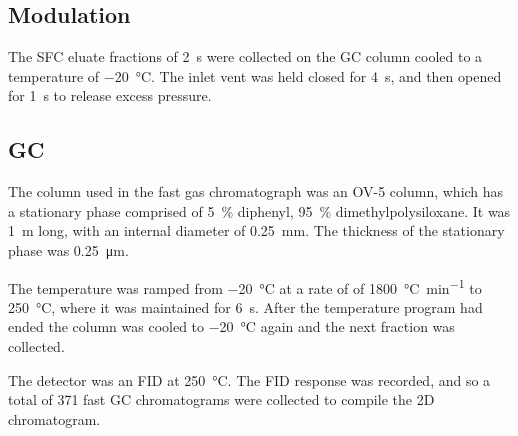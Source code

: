 \subsection{Modulation}

The SFC eluate fractions of \SI{2}{\second} were collected on the GC column
cooled to a temperature of \SI{-20}{\celsius}. The inlet vent was held closed
for \SI{4}{\second}, and then opened for \SI{1}{\second} to release excess
pressure.

\subsection{GC}

The column used in the fast gas chromatograph was an OV-5 column, which has a
stationary phase comprised of \SI{5}{\percent} diphenyl, \SI{95}{\percent}
dimethylpolysiloxane. It was \SI{1}{\metre} long, with an internal diameter of
\SI{0.25}{\milli\metre}. The thickness of the stationary phase was
\SI{0.25}{\micro\metre}.

The temperature was ramped from \SI{-20}{\celsius} at a rate of of
\SI{1800}{\celsius\per\minute} to \SI{250}{\celsius}, where it was maintained
for \SI{6}{s}. After the temperature program had ended the column was cooled to
\SI{-20}{\celsius} again and the next fraction was collected.

The detector was an FID at \SI{250}{\celsius}. The FID response was recorded,
and so a total of 371 fast GC chromatograms were collected to compile the 2D
chromatogram.


